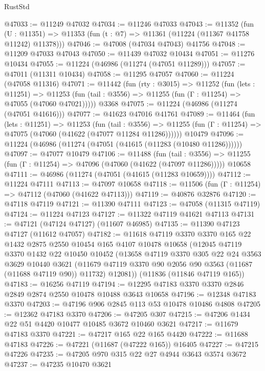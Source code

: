 \begin{lexlean}{RustStd}
\begin{coremodule}
@47033 := @11249 @47032
@47034 := @11246 @47033
@47043 := @11352
    (fun (U : @11351) => @11353 (fun (t : @7) => @11361 (@11224 (@11367 @41758 @11242) @11378)))
@47046 := @47008 (@47034 @47043) @41756
@47048 := @11209 @47033 @47043
@47050 := @11439 @47032 @10434
@47051 := @11276 @10434
@47055 := @11224 (@46986 (@11274 (@47051 @11289)))
@47057 := @47011 (@11311 @10434)
@47058 := @11295 @47057
@47060 := @11224 (@47058 @11316)
@47071 := @11442
    (fun (rty : @3015) =>
    @11252
      (fun (lets : @11251) =>
      @11253 (fun (tail : @3556) => @11255 (fun (Γ : @11254) => @47055 (@47060 @47021)))))
    @3368
@47075 := @11224 (@46986 (@11274 (@47051 @41616)))
@47077 := @41623 @47016 @41761
@47089 := @11464
    (fun (lets : @11251) =>
    @11253
      (fun (tail : @3556) =>
      @11255 (fun (Γ : @11254) => @47075 (@47060 (@41622 (@47077 @11284 @11286))))))
    @10479
@47096 := @11224 (@46986 (@11274 (@47051 (@41615 (@11283 (@10480 @11286))))))
@47097 := @47077 @10479
@47106 := @11488
    (fun (tail : @3556) => @11255 (fun (Γ : @11254) => @47096 (@47060 (@41622 (@47097 @11286)))))
    @10658
@47111 := @46986 (@11274 (@47051 (@41615 (@11283 @10659))))
@47112 := @11224 @47111
@47113 := @47097 @10658
@47118 := @11506 (fun (Γ : @11254) => @47112 (@47060 (@41622 @47113)))
@47119 := @40876 @32876
@47120 := @47118 @47119
@47121 := @11390 @47111
@47123 := @47058 (@11315 @47119)
@47124 := @11224 @47123
@47127 := @11322 @47119 @41621 @47113
@47131 := @47121 (@47124 @47127) (@11607 @46985)
@47135 := @11390 @47123 @47127 (@11612 @47057)
@47182 := @11618
    @47119
    @3370
    @3370
    @165
    @22
    @1432
    @2875
    @2550
    @10454
    @165
    @4107
    @10478
    @10658
    (@12045
      @47119
      @3370
      @1432
      @22
      @10450
      @10452
      (@13658
        @47119
        @3370
        @305
        @22
        @24
        @3563
        @3629
        @10440
        @3621
        (@11679 @47119 @3370 @90 @2056 @90 @3563 (@11687 (@11688 @47119 @90)) @11732)
        @12081))
    (@11836 (@11846 @47119 @165))
@47183 := @16256 @47119
@47194 := @12295 @47183 @3370 @3370 @2846 @2849 @2874 @2550 @10478 @10488 @3643 @10658
@47196 := @12348 @47183 @3370
@47203 := @47196 @906 @2845 @113 @53 @10478 @10486 @4808
@47205 := @12362 @47183 @3370
@47206 := @47205 @307
@47215 := @47206 @1434 @22 @51 @4420 @10477 @10485 @3672 @10460 @3621
@47217 := @11679 @47183 @3370
@47221 := @47217 @165 @22 @165 @4420
@47222 := @11688 @47183
@47226 := @47221 (@11687 (@47222 @165)) @16405
@47227 := @47215 @47226
@47235 := @47205 @970 @315 @22 @27 @4944 @3643 @3574 @3672
@47237 := @47235 @10470 @3621

\end{coremodule}
\end{lexlean}
